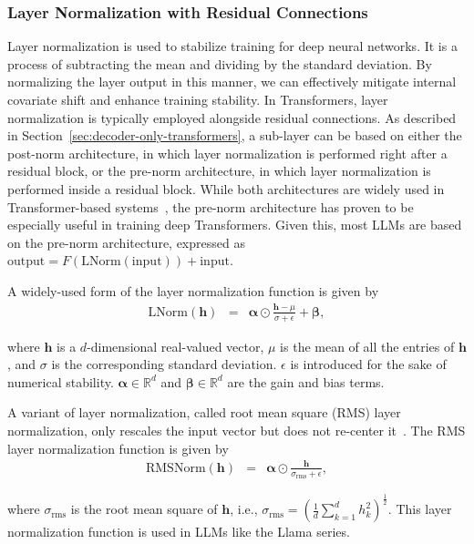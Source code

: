 \subsubsection{Layer Normalization with Residual Connections}

\noindent Layer normalization is used to stabilize training for deep neural networks. It is a process of subtracting the mean and dividing by the standard deviation. By normalizing the layer output in this manner, we can effectively mitigate internal covariate shift and enhance training stability. In Transformers, layer normalization is typically employed alongside residual connections. As described in Section~\ref{sec:decoder-only-transformers}, a sub-layer can be based on either the post-norm architecture, in which layer normalization is performed right after a residual block, or the pre-norm architecture, in which layer normalization is performed inside a residual block. While both architectures are widely used in Transformer-based systems~\cite{wang-etal:2019learning}, the pre-norm architecture has proven to be especially useful in training deep Transformers. Given this, most LLMs are based on the pre-norm architecture, expressed as $\mathrm{output} = F(\mathrm{LNorm}(\mathrm{input})) + \mathrm{input}$.

A widely-used form of the layer normalization function is given by
\begin{eqnarray}
\mathrm{LNorm}(\mathbf{h}) & = & \boldsymbol{\alpha} \odot \frac{\mathbf{h} - \mu}{\sigma + \epsilon} + \boldsymbol{\beta},
\end{eqnarray}

\noindent where $\mathbf{h}$ is a $d$-dimensional real-valued vector, $\mu$ is the mean of all the entries of $\mathbf{h}$, and $\sigma$ is the corresponding standard deviation. $\epsilon$ is introduced for the sake of numerical stability. $\boldsymbol{\alpha} \in \mathbb{R}^{d}$ and $\boldsymbol{\beta} \in \mathbb{R}^{d}$ are the gain and bias terms.

A variant of layer normalization, called root mean square (RMS) layer normalization, only rescales the input vector but does not re-center it~\cite{zhang-sennrich:2019root}. The RMS layer normalization function is given by
\begin{eqnarray}
\mathrm{RMSNorm}(\mathbf{h}) & = & \boldsymbol{\alpha} \odot \frac{\mathbf{h}}{\sigma_{\mathrm{rms}} + \epsilon},
\end{eqnarray}

\noindent where $\sigma_{\mathrm{rms}}$ is the root mean square of $\mathbf{h}$, i.e., $\sigma_{\mathrm{rms}} = (\frac{1}{d} \sum_{k=1}^{d} h_k^2)^{\frac{1}{2}}$. This layer normalization function is used in LLMs like the Llama series.

